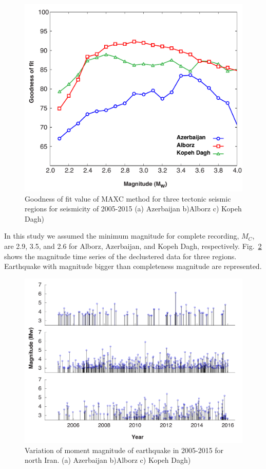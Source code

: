 \begin{figure} [ht]
\centering
\includegraphics[scale=0.4]{figures/pdf/Figure03.pdf} 
\caption{Goodness of fit value of MAXC method for three tectonic seismic regions for seismicity of 2005-2015 (a) Azerbaijan b)Alborz c) Kopeh Dagh)}
\label{fig:completeness}
\end{figure} 





\noindent
In this study we assumed the minimum magnitude for complete recording, $M_C$, are 2.9, 3.5, and 2.6 for Alborz, Azerbaijan, and Kopeh Dagh, respectively. Fig.~\ref{fig:mag-time} shows the magnitude time series of the declustered data for three regions. Earthquake with magnitude bigger than completeness magnitude are represented. 

\begin{figure} [ht]
\centering
\includegraphics[scale=0.5]{figures/pdf/Figure04.pdf} 
\caption{Variation of moment magnitude of earthquake in 2005-2015 for north Iran. (a) Azerbaijan b)Alborz c) Kopeh Dagh)}
\label{fig:mag-time}
\end{figure} 








